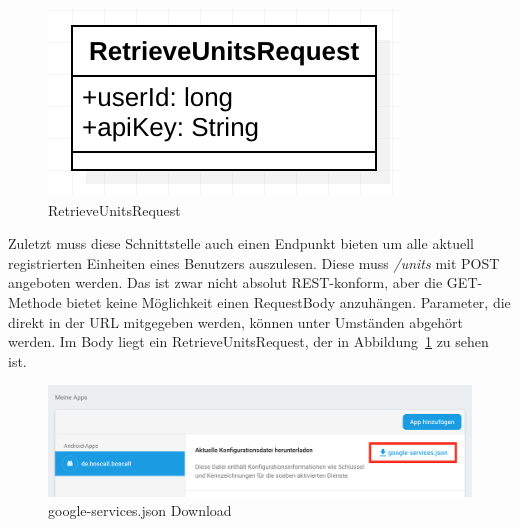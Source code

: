 \begin{figure}[h]
	\centering
	\includegraphics{include/img/retrieveunitsrequest}
	\caption{RetrieveUnitsRequest}
	\label{fig:retrieveUnitsRequest}
\end{figure}
Zuletzt muss diese Schnittstelle auch einen Endpunkt bieten um alle aktuell registrierten Einheiten eines Benutzers auszulesen. Diese muss \textit{/units} mit POST angeboten werden. Das ist zwar nicht absolut REST-konform, aber die GET-Methode bietet keine Möglichkeit einen RequestBody anzuhängen. Parameter, die direkt in der URL mitgegeben werden, können unter Umständen abgehört werden. Im Body liegt ein RetrieveUnitsRequest, der in Abbildung~\ref{fig:retrieveUnitsRequest} zu sehen ist.

\begin{figure}
	\centering
	\includegraphics[width=\linewidth]{include/img/google-services-json}
	\caption{google-services.json Download}
	\label{fig:google-services-json-download}
\end{figure}

